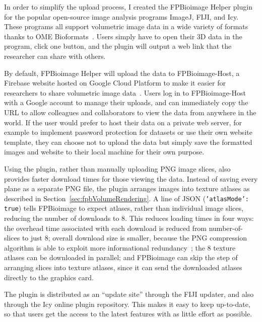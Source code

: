 In order to simplify the upload process, I created the FPBioimage Helper plugin for the popular open-source image analysis programs ImageJ, FIJI, and Icy.
These programs all support volumetric image data in a wide variety of formats thanks to OME Bioformats~\cite{linkert2010metadata}.
Users simply have to open their 3D data in the program, click one button, and the plugin will output a web link that the researcher can share with others.

By default, FPBioimage Helper will upload the data to FPBioimage-Host, a Firebase website hosted on Google Cloud Platform to make it easier for researchers to share volumetric image data~\cite{fpbhost}.
Users log in to FPBioimage-Host with a Google account to manage their uploads, and can immediately copy the URL to allow colleagues and collaborators to view the data from anywhere in the world. 
If the user would prefer to host their data on a private web server, for example to implement password protection for datasets or use their own website template, they can choose not to upload the data but simply save the formatted images and website to their local machine for their own purpose.

Using the plugin, rather than manually uploading PNG image slices, also provides faster download times for those viewing the data.
Instead of saving every plane as a separate PNG file, the plugin arranges images into texture atlases as described in Section~\ref{sec:fpbVolumeRendering}.
A line of JSON (\texttt{'atlasMode': true}) tells FPBioimage to expect atlases, rather than individual image slices, reducing the number of downloads to 8.
This reduces loading times in four ways: the overhead time associated with each download is reduced from number-of-slices to just 8; overall download size is smaller, because the PNG compression algorithm is able to exploit more informational redundancy~\cite[\textit{ch. 1}]{jayaraman2011digital}; the 8 texture atlases can be downloaded in parallel; and FPBioimage can skip the step of arranging slices into texture atlases, since it can send the downloaded atlases directly to the graphics card.

The plugin is distributed as an ``update site'' through the FIJI updater, and also through the Icy online plugin repository.
This makes it easy to keep up-to-date, so that users get the access to the latest features with as little effort as possible.

